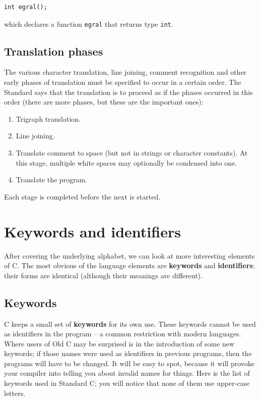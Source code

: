    \begin{Verbatim}
int egral();
\end{Verbatim}

   which declares a function \texttt{egral} that returns type
    \texttt{int}.


  

  \subsection{Translation phases}
   

   The various character translation, line joining, comment recognition
    and other early phases of translation must be specified to occur in a
    certain order. The Standard says that the translation is to proceed as if
    the phases occurred in this order (there are more phases, but these are
    the important ones):


   \begin{enumerate}
    \item Trigraph translation.
    \item Line joining.
    \item Translate comment to space (but not in strings or character
     constants). At this stage, multiple white spaces may optionally be
     condensed into one.
    \item Translate the program.
   \end{enumerate}

   Each stage is completed before the next is started.


  

 
        \section{Keywords and identifiers}
        

  

  After covering the underlying alphabet, we can look at more interesting
   elements of C. The most obvious of the language elements are
   \textbf{keywords} and \textbf{identifiers}; their forms are identical
   (although their meanings are different).


  \subsection{Keywords}
   

   C keeps a small set of \textbf{keywords} for its own use. These
    keywords cannot be used as identifiers in the program -- a common
    restriction with modern languages. Where users of Old C may be surprised
    is in the introduction of some new keywords; if those names were used as
    identifiers in previous programs, then the programs will have to be
    changed. It will be easy to spot, because it will provoke your compiler
    into telling you about invalid names for things. Here is the list of
    keywords used in Standard C; you will notice that none of them use
    upper-case letters.


